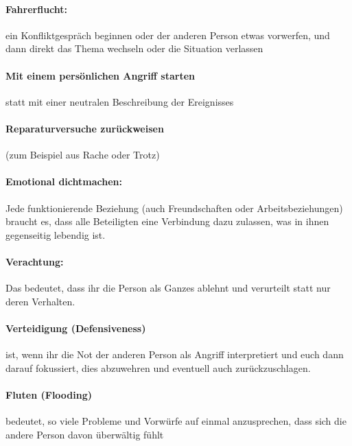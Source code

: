 \paragraph{Fahrerflucht:} ein Konfliktgespräch beginnen oder der anderen Person etwas vorwerfen, und dann direkt das Thema wechseln oder die Situation verlassen

\paragraph{Mit einem persönlichen Angriff starten} statt mit einer neutralen Beschreibung der Ereignisses

\paragraph{Reparaturversuche zurückweisen} (zum Beispiel aus Rache oder Trotz)

\paragraph{Emotional dichtmachen:} Jede funktionierende Beziehung (auch Freundschaften oder Arbeitsbeziehungen) braucht es, dass alle Beteiligten eine Verbindung dazu zulassen, was in ihnen gegenseitig lebendig ist.

\paragraph{Verachtung:} Das bedeutet, dass ihr die Person als Ganzes ablehnt und verurteilt statt nur deren Verhalten.

\paragraph{Verteidigung (Defensiveness)} ist, wenn ihr die Not der anderen Person als Angriff interpretiert und euch dann darauf fokussiert, dies abzuwehren und eventuell auch zurückzuschlagen.

\paragraph{Fluten (Flooding)} bedeutet, so viele Probleme und Vorwürfe auf einmal anzusprechen, dass sich die andere Person davon überwältig fühlt



